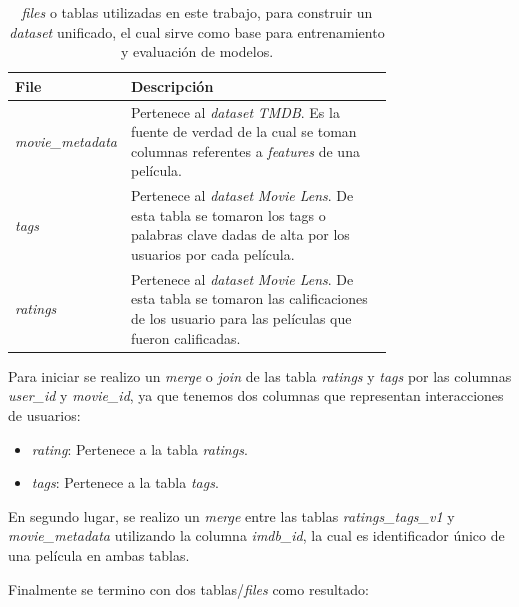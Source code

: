 \documentclass[11pt,a4paper,twoside]{thesis}
\begin{document}
\begin{table}[!htb]
	\centering
	\footnotesize
	\begin{tabular}{l | p{0.75\linewidth}}
		\hline
		File                     & Descripción                                                                                                                                              \\
		\hline
		\textit{movie\_metadata} & Pertenece al \textit{dataset} \textit{TMDB}. Es la fuente de verdad de la cual se toman columnas referentes a \textit{features} de una película.         \\
		\textit{tags}            & Pertenece al \textit{dataset} \textit{Movie Lens}. De esta tabla se tomaron los tags o palabras clave dadas de alta por los usuarios por cada película.  \\
		\textit{ratings}         & Pertenece al \textit{dataset} \textit{Movie Lens}. De esta tabla se tomaron las calificaciones de los usuario para las películas que fueron calificadas. \\
		\hline
	\end{tabular}
	\caption{
		\textit{files} o tablas utilizadas en este trabajo, para construir un \textit{dataset} unificado, el cual sirve como base para entrenamiento y evaluación de modelos.
	}
	\label{table:tableRatings}
\end{table}

Para iniciar se realizo un \textit{merge} o \textit{join} de las tabla
\textit{ratings} y \textit{tags} por las columnas \textit{user\_id} y
\textit{movie\_id}, ya que tenemos dos columnas que representan interacciones
de usuarios:

\begin{itemize}
	\item \textit{rating}: Pertenece a la tabla \textit{ratings}.
	\item \textit{tags}: Pertenece a la tabla \textit{tags}.
\end{itemize}

En segundo lugar, se realizo un \textit{merge} entre las tablas
\textit{ratings\_tags\_v1} y \textit{movie\_metadata} utilizando la columna
\textit{imdb\_id}, la cual es identificador único de una película en ambas
tablas.

Finalmente se termino con dos tablas/\textit{files} como resultado:
\end{document}
